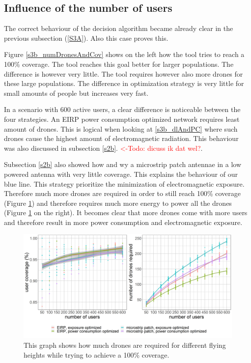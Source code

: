 \subsection{Influence of the number of users}
\label{S3B}

The correct behaviour of the decision algorithm became already clear in the previous subsection (\ref{S3A}). Also this 
case proves this.

Figure \ref{s3b_numDronesAndCov} shows on the left how the tool tries to reach a 100\% coverage. The tool reaches this goal 
better for larger populations. The difference is however very little. The tool requires however also more drones for these large 
populations. The difference in optimization strategy is very little for small amounts of people but increases very fast. 

In a scenario with 600 active users, a clear difference is noticeable between the four strategies. An EIRP power consumption optimized 
network requires least amount of drones. This is logical when looking at \ref{s3b_dlAndPC} where such drones cause the highest amount of 
electromagnetic radiation. This behaviour was also discussed in subsection \ref{s2b}. \textcolor{red}{<-Todo: dicuss ik dat wel?}.

Subsection \ref{s2b} also showed how and wy a microstrip patch antennae in a low powered antenna with very little coverage. This 
explains the behaviour of our blue line. This strategy prioritize the minimization of electromagnetic exposure. Therefore much more 
drones are required in order to still reach 100\% coverage (Figure \ref{fig:s3b_numDronesAndCov}) and therefore requires much more energy 
to power all the drones (Figure \ref{fig:s3b_numDronesAndCov} on the right).
It becomes clear that more drones come with more users  and therefore result in more power consumption and electromagnetic exposure.

\begin{figure}[]
  \includegraphics[width=\textwidth]{../results/s3/uvsnumdronesAndCov.png}
  \caption{This graph shows how much drones are required for different flying heights while trying to achieve a 100\% coverage.}
  \label{fig:s3b_numDronesAndCov}
\end{figure}


